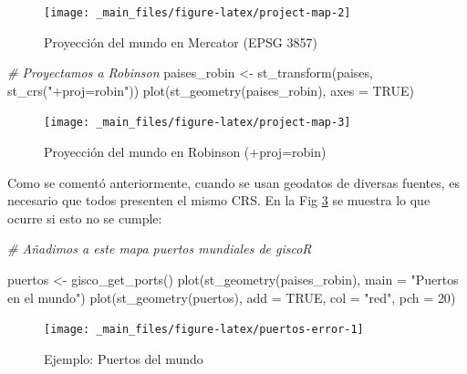 \documentclass[
]{book}
\newenvironment{Shaded}{\begin{snugshade}}{\end{snugshade}}
\newcommand{\AttributeTok}[1]{\textcolor[rgb]{0.77,0.63,0.00}{#1}}
\newcommand{\CommentTok}[1]{\textcolor[rgb]{0.56,0.35,0.01}{\textit{#1}}}
\newcommand{\ConstantTok}[1]{\textcolor[rgb]{0.00,0.00,0.00}{#1}}
\newcommand{\DecValTok}[1]{\textcolor[rgb]{0.00,0.00,0.81}{#1}}
\newcommand{\FunctionTok}[1]{\textcolor[rgb]{0.00,0.00,0.00}{#1}}
\newcommand{\NormalTok}[1]{#1}
\newcommand{\OtherTok}[1]{\textcolor[rgb]{0.56,0.35,0.01}{#1}}
\newcommand{\StringTok}[1]{\textcolor[rgb]{0.31,0.60,0.02}{#1}}
\begin{document}
\begin{figure}

{\centering \texttt{[image: \_main\_files/figure-latex/project-map-2]} 

}

\caption{Proyección del mundo en Mercator (EPSG 3857)}\label{fig:project-map-2}
\end{figure}

\begin{Shaded}
\begin{Highlighting}[]
\CommentTok{\# Proyectamos a Robinson}
\NormalTok{paises\_robin }\OtherTok{\textless{}{-}} \FunctionTok{st\_transform}\NormalTok{(paises, }\FunctionTok{st\_crs}\NormalTok{(}\StringTok{"+proj=robin"}\NormalTok{))}
\FunctionTok{plot}\NormalTok{(}\FunctionTok{st\_geometry}\NormalTok{(paises\_robin), }\AttributeTok{axes =} \ConstantTok{TRUE}\NormalTok{)}
\end{Highlighting}
\end{Shaded}

\begin{figure}

{\centering \texttt{[image: \_main\_files/figure-latex/project-map-3]} 

}

\caption{Proyección del mundo en Robinson (+proj=robin)}\label{fig:project-map-3}
\end{figure}

Como se comentó anteriormente, cuando se usan geodatos de diversas fuentes, es
necesario que todos presenten el mismo CRS. En la Fig \ref{fig:puertos-error}
se muestra lo que ocurre si esto no se cumple:

\begin{Shaded}
\begin{Highlighting}[]
\CommentTok{\# Añadimos a este mapa puertos mundiales de giscoR}

\NormalTok{puertos }\OtherTok{\textless{}{-}} \FunctionTok{gisco\_get\_ports}\NormalTok{()}
\FunctionTok{plot}\NormalTok{(}\FunctionTok{st\_geometry}\NormalTok{(paises\_robin), }\AttributeTok{main =} \StringTok{"Puertos en el mundo"}\NormalTok{)}
\FunctionTok{plot}\NormalTok{(}\FunctionTok{st\_geometry}\NormalTok{(puertos), }\AttributeTok{add =} \ConstantTok{TRUE}\NormalTok{, }\AttributeTok{col =} \StringTok{"red"}\NormalTok{, }\AttributeTok{pch =} \DecValTok{20}\NormalTok{)}
\end{Highlighting}
\end{Shaded}

\begin{figure}

{\centering \texttt{[image: \_main\_files/figure-latex/puertos-error-1]} 

}

\caption{Ejemplo: Puertos del mundo}\label{fig:puertos-error}
\end{figure}
\end{document}
